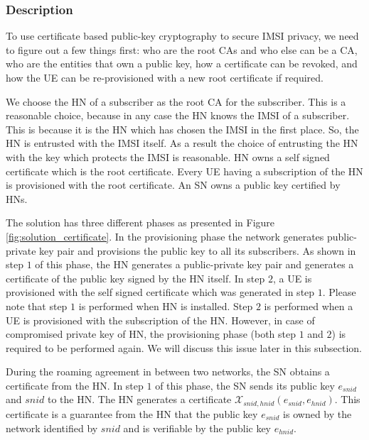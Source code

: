 \documentclass[runningheads,a4paper]{llncs} %
\begin{document}
\subsubsection{Description}
To use certificate based public-key cryptography to secure IMSI privacy, we need to figure out a few things first: who are the root CAs and who else can be a CA, who are the entities that own a public key, how a certificate can be revoked, and how the UE can be re-provisioned with a new root certificate if required.

We choose the HN of a subscriber as the root CA for the subscriber. This is a reasonable choice, because in any case the HN knows the IMSI of a subscriber. This is because it is the HN which has chosen the IMSI in the first place. So, the HN is entrusted with the IMSI itself. As a result the choice of entrusting the HN with the key which protects the IMSI is reasonable. HN owns a self signed certificate which is the root certificate. Every UE having a subscription of the HN is provisioned with the root certificate. An SN owns a public key certified by HNs. 

The solution has three different phases as presented in Figure \ref{fig:solution_certificate}. In the provisioning phase the network generates public-private key pair and provisions the public key to all its subscribers. As shown in step $1$ of this phase, the HN generates a public-private key pair and generates a certificate of the public key signed by the HN itself.  In step $2$, a UE is provisioned with the self signed certificate which was generated in step $1$. Please note that step $1$ is performed when HN is installed. Step $2$ is performed when a UE is provisioned with the subscription of the HN. However, in case of compromised private key of HN, the provisioning phase (both step $1$ and $2$) is required to be performed again. We will discuss this issue later in this subsection. 

During the roaming agreement in between two networks, the SN obtains a certificate from the HN. In step $1$ of this phase, the SN sends its public key $e_{snid}$ and $snid$ to the HN. The HN generates a certificate $\mathcal{X}_{snid,hnid} (e_{snid},e_{hnid})$. This certificate is a guarantee from the HN that the public key $e_{snid}$ is owned by the network identified by $snid$ and is verifiable by the public key $e_{hnid}$.
\end{document}
